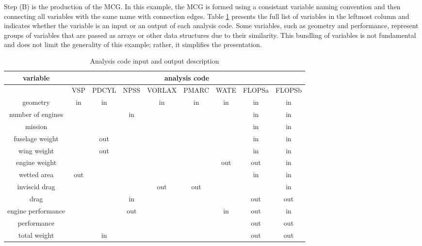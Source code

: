 Step (B) is the production of the MCG.
	In this example, the MCG is formed using a consistant variable naming convention and then connecting all variables with the same name with connection edges. 
	Table \ref{t:ins and outs} presents the full list of variables in the leftmost column and indicates whether the variable is an input or an output of each analysis code. 
	Some variables, such as geometry and performance, represent groups of variables that are passed as arrays or other data structures due to their similarity. 
	This bundling of variables is not fundamental and does not limit the generality of this example; rather, it simplifies the presentation.
	\begin{table}[htb!]
	  \centering
	  \caption{Analysis code input and output description}
		\begin{tabular}{ccccccccc}
		\toprule
		variable & \multicolumn{8}{c}{analysis code} \\
		\midrule
			  & VSP   & PDCYL & NPSS  & VORLAX & PMARC & WATE  & FLOPSa & FLOPSb \\
		geometry & in    & in    &       & in    & in    & in    & in    & in \\
		number of engines &       &       & in    &       &       &       & in    & in \\
		mission &       &       &       &       &       &       & in    & in \\
		fuselage weight &       & out   &       &       &       &       & in    & in \\
		wing weight &       & out   &       &       &       &       & in    & in \\
		engine weight &       &       &       &       &       & out   & out   & in \\
		wetted area & out   &       &       &       &       &       & in    & in \\
		inviscid drag &       &       &       & out   & out   &       &       & in \\
		drag  &       &       & in    &       &       &       & out   & out \\
		engine performance &       &       & out   &       &       & in    & out   & in \\
		performance &       &       &       &       &       &       & out   & out \\
		total weight &       & in    &       &       &       &       & out   & out \\
		\bottomrule
		\end{tabular}
	  \label{t:ins and outs}
	\end{table}

